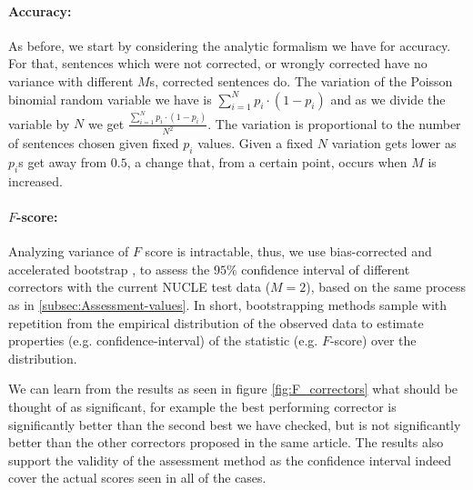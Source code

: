 \documentclass[letter,11pt]{article}
\begin{document}
		\begin{figure}
			\texttt{[image: \$F\_\{0.5]}$_Ms_significance}
			\caption{F Score results with different sizes of gold standard.\label{fig:F_Ms}}
		\end{figure}
		\begin{figure}
			\texttt{[image: \$F\_\{0.5]}$_significance}
			\caption{F Score results for different correctors including confidence interval.\label{fig:F_correctors}}
		\end{figure}
		
		
		\paragraph{Accuracy:} As before, we start by considering the analytic formalism we have for accuracy. For that, sentences which were not corrected, or wrongly corrected have no variance with different $M$s, corrected sentences do. The variation of the Poisson binomial random variable we have is $\sum_{i=1}^{N}p_i\cdot\left(1-p_i\right)$ and as we divide the variable by $N$ we get $\frac{\sum_{i=1}^{N}p_i\cdot\left(1-p_i\right)}{N^2}$. 
		The variation is proportional to the number of sentences chosen given fixed $p_i$ values. Given a fixed $N$ variation gets lower as $p_i$s get away from $0.5$, a change that, from a certain point, occurs when $M$ is increased.
		
		\paragraph{$F$-score:} Analyzing variance of $F$ score is intractable\cite{yeh2000more}, thus, we use bias-corrected and accelerated bootstrap \cite{efron1987better}, to assess the $95\%$ confidence interval of different correctors with the current NUCLE test data ($M=2$), based on the same process as in \ref{subsec:Assessment-values}. In short, bootstrapping methods sample with repetition from the empirical distribution of the observed data to estimate properties (e.g. confidence-interval) of the statistic (e.g. $F$-score) over the distribution. 
		
		We can learn from the results as seen in figure \ref{fig:F_correctors} what should be thought of as significant, for example the best performing corrector is significantly better than the second best we have checked, but is not significantly better than the other correctors proposed in the same article\cite{rozovskaya2016grammatical}. The results also  support the validity of the assessment method as the confidence interval indeed cover the actual scores seen in all of the cases. 
		
\end{document}
